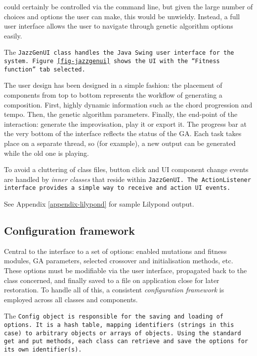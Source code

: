 \jg{} could certainly be controlled via the command line, but given the large number of choices and options the user can make, this would be unwieldy. Instead, a full user interface allows the user to navigate through genetic algorithm options easily.


The \tt{JazzGenUI} class handles the Java Swing user interface for the system. Figure \ref{fig-jazzgenui} shows the UI with the ``Fitness function'' tab selected.

The user design has been designed in a simple fashion: the placement of components from top to bottom represents the workflow of generating a composition. First, highly dynamic information such as the chord progression and tempo. Then, the genetic algorithm parameters. Finally, the end-point of the interaction: generate the improvisation, play it or export it. The progress bar at the very bottom of the interface reflects the status of the GA. Each task takes place on a separate thread, so (for example), a new output can be generated while the old one is playing.

To avoid a cluttering of class files, button click and UI component change events are handled by \emph{inner classes} that reside within \tt{JazzGenUI}. The \tt{ActionListener} interface provides a simple way to receive and action UI events.

See Appendix \ref{appendix-lilypond} for sample Lilypond output.

\subsection{Configuration framework}

Central to the interface to a set of options: enabled mutations and fitness modules, GA parameters, selected crossover and initialisation methods, etc. These options must be modifiable via the user interface, propagated back to the class concerned, and finally saved to a file on application close for later restoration. To handle all of this, a consistent \emph{configuration framework} is employed across all classes and components.

The \tt{Config} object is responsible for the saving and loading of options. It is a hash table, mapping identifiers (strings in this case) to arbitrary objects or arrays of objects. Using the standard \tt{get} and \tt{put} methods, each class can retrieve and save the options for its own identifier(s).

